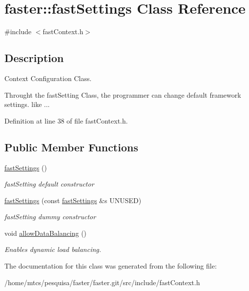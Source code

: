 \hypertarget{classfaster_1_1fastSettings}{}\section{faster\+:\+:fast\+Settings Class Reference}
\label{classfaster_1_1fastSettings}


{\ttfamily \#include $<$fast\+Context.\+h$>$}



\subsection{Description}
Context Configuration Class. 

Throught the fast\+Setting Class, the programmer can change default framework settings. like ... 

Definition at line 38 of file fast\+Context.\+h.

\subsection*{Public Member Functions}
\begin{DoxyCompactItemize}
\item 
\hypertarget{classfaster_1_1fastSettings_a29deb352bf81074dac468dfe5af20cc5}{}\label{classfaster_1_1fastSettings_a29deb352bf81074dac468dfe5af20cc5} 
\hyperlink{classfaster_1_1fastSettings_a29deb352bf81074dac468dfe5af20cc5}{fast\+Settings} ()
\begin{DoxyCompactList}\small\item\em fast\+Setting default constructor \end{DoxyCompactList}\item 
\hypertarget{classfaster_1_1fastSettings_ae63a2b5a6accbf3600bc9ac659269532}{}\label{classfaster_1_1fastSettings_ae63a2b5a6accbf3600bc9ac659269532} 
\hyperlink{classfaster_1_1fastSettings_ae63a2b5a6accbf3600bc9ac659269532}{fast\+Settings} (const \hyperlink{classfaster_1_1fastSettings}{fast\+Settings} \&s U\+N\+U\+S\+ED)
\begin{DoxyCompactList}\small\item\em fast\+Setting dummy constructor \end{DoxyCompactList}\item 
\hypertarget{classfaster_1_1fastSettings_a33acd4169431c784d12bf960cacda6ed}{}\label{classfaster_1_1fastSettings_a33acd4169431c784d12bf960cacda6ed} 
void \hyperlink{classfaster_1_1fastSettings_a33acd4169431c784d12bf960cacda6ed}{allow\+Data\+Balancing} ()
\begin{DoxyCompactList}\small\item\em Enables dynamic load balancing. \end{DoxyCompactList}\end{DoxyCompactItemize}


The documentation for this class was generated from the following file\+:\begin{DoxyCompactItemize}
\item 
/home/mtcs/pesquisa/faster/faster.\+git/src/include/fast\+Context.\+h\end{DoxyCompactItemize}
